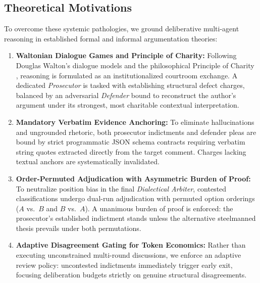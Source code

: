 \documentclass[11pt]{article}
\begin{document}
\subsection*{Theoretical Motivations}
To overcome these systemic pathologies, we ground deliberative multi-agent reasoning in established formal and informal argumentation theories:
\begin{enumerate}[leftmargin=*,itemsep=1.5pt,topsep=2pt]
    \item \textbf{Waltonian Dialogue Games and Principle of Charity:} Following Douglas Walton's dialogue models \cite{walton1998} and the philosophical Principle of Charity \cite{quine1960,davidson1973,govier1987}, reasoning is formulated as an institutionalized courtroom exchange. A dedicated \textit{Prosecutor} is tasked with establishing structural defect charges, balanced by an adversarial \textit{Defender} bound to reconstruct the author's argument under its strongest, most charitable contextual interpretation.
    \item \textbf{Mandatory Verbatim Evidence Anchoring:} To eliminate hallucinations and ungrounded rhetoric, both prosecutor indictments and defender pleas are bound by strict programmatic JSON schema contracts requiring verbatim string quotes extracted directly from the target comment. Charges lacking textual anchors are systematically invalidated.
    \item \textbf{Order-Permuted Adjudication with Asymmetric Burden of Proof:} To neutralize position bias in the final \textit{Dialectical Arbiter}, contested classifications undergo dual-run adjudication with permuted option orderings ($A$ vs.\ $B$ and $B$ vs.\ $A$). A unanimous burden of proof is enforced: the prosecutor's established indictment stands unless the alternative steelmanned thesis prevails under both permutations.
    \item \textbf{Adaptive Disagreement Gating for Token Economics:} Rather than executing unconstrained multi-round discussions, we enforce an adaptive review policy: uncontested indictments immediately trigger early exit, focusing deliberation budgets strictly on genuine structural disagreements.
\end{enumerate}
\end{document}

